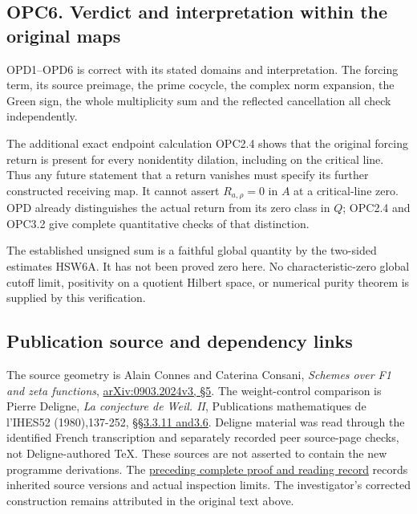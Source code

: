 \subsection{OPC6. Verdict and interpretation within the original
maps}\label{opc6.-verdict-and-interpretation-within-the-original-maps}

OPD1--OPD6 is correct with its stated domains and interpretation. The
forcing term, its source preimage, the prime cocycle, the complex norm
expansion, the Green sign, the whole multiplicity sum and the reflected
cancellation all check independently.

The additional exact endpoint calculation OPC2.4 shows that the original
forcing return is present for every nonidentity dilation, including on
the critical line. Thus any future statement that a return vanishes must
specify its further constructed receiving map. It cannot assert
\(R_{a,\rho}=0\) in \(A\) at a critical-line zero. OPD already
distinguishes the actual return from its zero class in \(Q\); OPC2.4 and
OPC3.2 give complete quantitative checks of that distinction.

The established unsigned sum is a faithful global quantity by the
two-sided estimates HSW6A. It has not been proved zero here. No
characteristic-zero global cutoff limit, positivity on a quotient
Hilbert space, or numerical purity theorem is supplied by this
verification.

\subsection{Publication source and dependency
links}\label{publication-source-and-dependency-links}

The source geometry is Alain Connes and Caterina Consani, \emph{Schemes
over F1 and zeta functions},
\href{https://arxiv.org/abs/0903.2024v3}{arXiv:0903.2024v3, §5}. The
weight-control comparison is Pierre Deligne, \emph{La conjecture de
Weil. II}, Publications mathematiques de l'IHES52 (1980),137-252,
\href{https://www.numdam.org/item/PMIHES_1980__52__137_0/}{§§3.3.11
and3.6}. Deligne material was read through the identified French
transcription and separately recorded peer source-page checks, not
Deligne-authored TeX. These sources are not asserted to contain the new
programme derivations. The
\href{https://github.com/KokunoYumeto/zeta-function-research-reader/blob/36a82ecca98addb8a98b48204e349737856c7223/workbenches/splitzero-tandem/continuations/20260924-cohomology-weight-and-character-lifts/BUILD_AND_REVIEW.md}{preceding
complete proof and reading record} records inherited source versions and
actual inspection limits. The investigator's corrected construction
remains attributed in the original text above.
